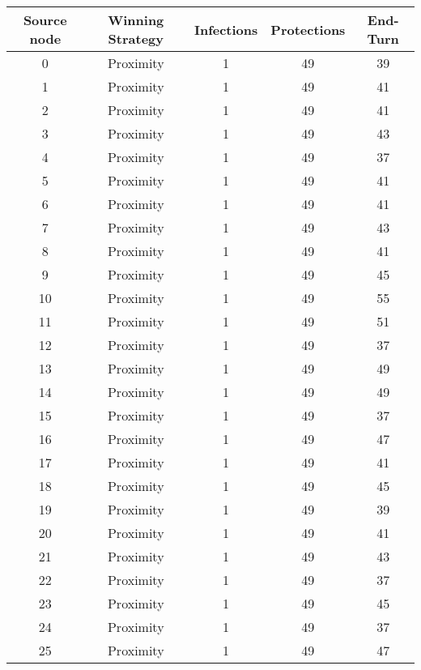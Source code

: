 \documentclass[results.tex]{subfiles}
\begin{document}
\begin{center}
  \begin{tabular}{| c || c | c | c | c |}
    \hline
    {\bfseries Source node} & {\bfseries Winning Strategy} & {\bfseries Infections} & {\bfseries Protections} & {\bfseries End-Turn} \\  %
    \hline\hline
    0 & Proximity & 1 & 49 & 39 \\ 
    \hline
    1 & Proximity & 1 & 49 & 41 \\ 
    \hline
    2 & Proximity & 1 & 49 & 41 \\ 
    \hline
    3 & Proximity & 1 & 49 & 43 \\ 
    \hline
    4 & Proximity & 1 & 49 & 37 \\ 
    \hline
    5 & Proximity & 1 & 49 & 41 \\ 
    \hline
    6 & Proximity & 1 & 49 & 41 \\ 
    \hline
    7 & Proximity & 1 & 49 & 43 \\ 
    \hline
    8 & Proximity & 1 & 49 & 41 \\ 
    \hline
    9 & Proximity & 1 & 49 & 45 \\ 
    \hline
    10 & Proximity & 1 & 49 & 55 \\ 
    \hline
    11 & Proximity & 1 & 49 & 51 \\ 
    \hline
    12 & Proximity & 1 & 49 & 37 \\ 
    \hline
    13 & Proximity & 1 & 49 & 49 \\ 
    \hline
    14 & Proximity & 1 & 49 & 49 \\ 
    \hline
    15 & Proximity & 1 & 49 & 37 \\ 
    \hline
    16 & Proximity & 1 & 49 & 47 \\ 
    \hline
    17 & Proximity & 1 & 49 & 41 \\ 
    \hline
    18 & Proximity & 1 & 49 & 45 \\ 
    \hline
    19 & Proximity & 1 & 49 & 39 \\ 
    \hline
    20 & Proximity & 1 & 49 & 41 \\ 
    \hline
    21 & Proximity & 1 & 49 & 43 \\ 
    \hline
    22 & Proximity & 1 & 49 & 37 \\ 
    \hline
    23 & Proximity & 1 & 49 & 45 \\ 
    \hline
    24 & Proximity & 1 & 49 & 37 \\ 
    \hline
    25 & Proximity & 1 & 49 & 47 \\ 

\end{tabular}
\end{center}
\end{document}

